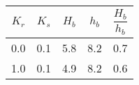 \begin{tabular}{ccccc}
$K_{r}$ & $K_{s}$ & $H_{b}$ & $h_{b}$ & $\dfrac{H_{b}}{h_{b}}$ \\
\hline
0.0 & 0.1 & 5.8 & 8.2 & 0.7 \\
1.0 & 0.1 & 4.9 & 8.2 & 0.6 \\
\hline
\end{tabular}
